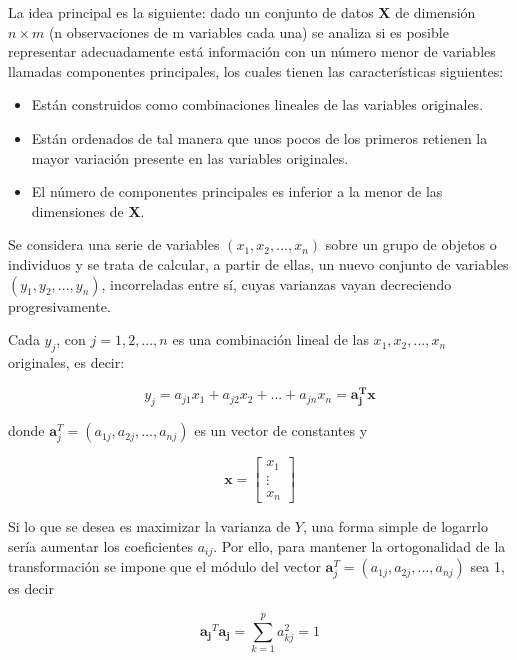 La idea principal es la siguiente: dado un conjunto de datos \textbf{X} de dimensión $n \times m$ (n observaciones de m variables cada una) se analiza si es posible representar adecuadamente está información con un número menor de variables llamadas componentes principales, los cuales tienen las características siguientes: 

\begin{itemize}
\item Están construidos como combinaciones lineales de las variables originales. 
\item Están ordenados de tal manera que unos pocos de los primeros retienen la mayor variación presente en las variables originales.
\item El número de componentes principales es inferior a la menor de las dimensiones de \textbf{X}.\\
\end{itemize}

Se considera una serie de variables $(x_{1},x_{2}, ..., x_{n})$ sobre un grupo de objetos o individuos y se trata de calcular, a partir de ellas, un nuevo conjunto de variables $(y_{1}, y_{2}, ..., y_{n})$, incorreladas entre sí, cuyas varianzas vayan decreciendo progresivamente.

Cada $y_{j}$, con  $j=1,2, ...,n$ es una combinación lineal de las $x_{1},x_{2}, ..., x_{n}$ originales, es decir:

\begin{equation}
y_{j} = a_{j1}x_{1} + a_{j2}x_{2} + ... + a_{jn}x_{n} = \mathbf{a^{T}_{j}x} 
\nonumber
\end{equation}

donde $\mathbf{a}^{T}_{j} = (a_{1j}, a_{2j}, ..., a_{nj})$ es un vector de constantes y

\begin{equation}
\mathbf{x} =
\begin{bmatrix}
x_{1} \\
\vdots \\
x_{n}
\end{bmatrix}
\nonumber
\end{equation}

Si lo que se desea es maximizar la varianza de $Y$, una forma simple de logarrlo sería aumentar los coeficientes $a_{ij}$. Por ello, para mantener la ortogonalidad de la transformación se impone que el módulo del vector $\mathbf{a}^{T}_{j} = (a_{1j}, a_{2j}, ..., a_{nj})$ sea 1, es decir

\begin{equation}
\mathbf{a_{j}}^{T} \mathbf{a_{j}} = \sum_{k=1}^{p}a_{kj}^{2} = 1
\end{equation}

